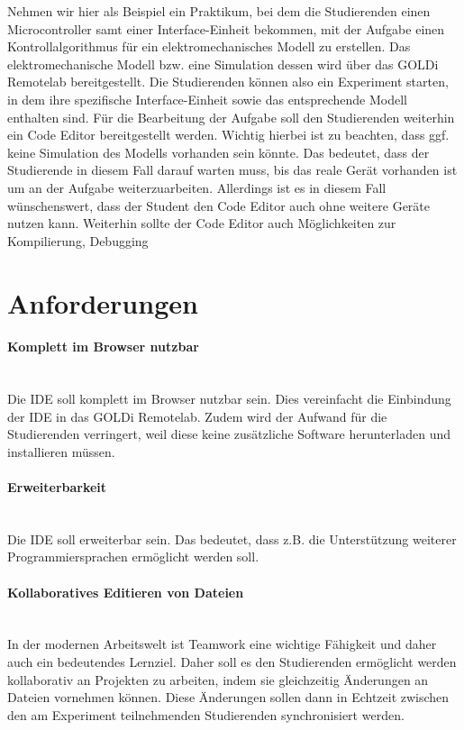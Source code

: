 Nehmen wir hier als Beispiel ein Praktikum, bei dem die Studierenden einen Microcontroller samt einer Interface-Einheit bekommen, mit der Aufgabe einen Kontrollalgorithmus für ein elektromechanisches Modell zu erstellen. Das elektromechanische Modell bzw. eine Simulation dessen wird über das GOLDi Remotelab bereitgestellt. Die Studierenden können also ein Experiment starten, in dem ihre spezifische Interface-Einheit sowie das entsprechende Modell enthalten sind. Für die Bearbeitung der Aufgabe soll den Studierenden weiterhin ein Code Editor bereitgestellt werden. Wichtig hierbei ist zu beachten, dass ggf. keine Simulation des Modells vorhanden sein könnte. Das bedeutet, dass der Studierende in diesem Fall darauf warten muss, bis das reale Gerät vorhanden ist um an der Aufgabe weiterzuarbeiten. Allerdings ist es in diesem Fall wünschenswert, dass der Student den Code Editor auch ohne weitere Geräte nutzen kann. Weiterhin sollte der Code Editor auch Möglichkeiten zur Kompilierung, Debugging

\section{Anforderungen} \label{anforderungen}

\paragraph{Komplett im Browser nutzbar} \mbox{} \\
Die IDE soll komplett im Browser nutzbar sein. Dies vereinfacht die Einbindung der IDE in das GOLDi Remotelab. Zudem wird der Aufwand für die Studierenden verringert, weil diese keine zusätzliche Software herunterladen und installieren müssen.

\paragraph{Erweiterbarkeit} \mbox{} \\
Die IDE soll erweiterbar sein. Das bedeutet, dass z.B. die Unterstützung weiterer Programmiersprachen ermöglicht werden soll.

\paragraph{Kollaboratives Editieren von Dateien} \mbox{} \\
In der modernen Arbeitswelt ist Teamwork eine wichtige Fähigkeit und daher auch ein bedeutendes Lernziel. Daher soll es den Studierenden ermöglicht werden kollaborativ an Projekten zu arbeiten, indem sie gleichzeitig Änderungen an Dateien vornehmen können. Diese Änderungen sollen dann in Echtzeit zwischen den am Experiment teilnehmenden Studierenden synchronisiert werden.


